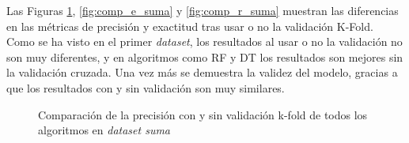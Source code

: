 \newpage

Las Figuras \ref{fig:comp_p_suma}, \ref{fig:comp_e_suma} y \ref{fig:comp_r_suma} muestran las diferencias en las métricas de precisión y exactitud tras usar o no la validación K-Fold. Como se ha visto en el primer \textit{dataset}, los resultados al usar o no la validación no son muy diferentes, y en algoritmos como \gls{RF} y \gls{DT} los resultados son mejores sin la validación cruzada. Una vez más se demuestra la validez del modelo, gracias a que los resultados con y sin validación son muy similares.

\begin{figure}[h!]
    \begin{center}
    \caption{Comparación de la precisión con y sin validación k-fold de todos los algoritmos en \textit{dataset suma}}
    \label{fig:comp_p_suma}
    \end{center}
\end{figure}

